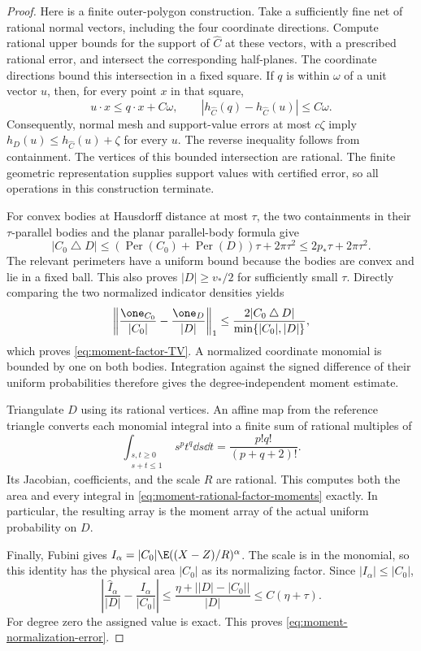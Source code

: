 \begin{proof}
Here is a finite outer-polygon construction.  Take a sufficiently
fine net of rational normal vectors, including the four coordinate
directions.  Compute rational upper bounds for the support of
$\widehat C$ at these vectors, with a prescribed rational error,
and intersect the corresponding half-planes.  The coordinate
directions bound this intersection in a fixed square.  If $q$ is
within $\omega$ of a unit vector $u$, then, for every point $x$ in
that square,
\[
 u\cdot x\le q\cdot x+C\omega,
 \qquad
 |h_{\widehat C}(q)-h_{\widehat C}(u)|\le C\omega.
\]
Consequently, normal mesh and support-value errors at most
$c\zeta$ imply $h_D(u)\le h_{\widehat C}(u)+\zeta$ for every $u$.
The reverse inequality follows from containment.  The vertices of
this bounded intersection are rational.  The finite geometric
representation supplies support values with certified error, so all
operations in this construction terminate.

For convex bodies at Hausdorff distance at most $\tau$, the two
containments in their $\tau$-parallel bodies and the planar
parallel-body formula give
\[
 |C_0\mathbin\triangle D|
       \le (\operatorname{Per}(C_0)+\operatorname{Per}(D))\tau
                    +2\pi\tau^2
       \le 2p_*\tau+2\pi\tau^2.
\]
The relevant perimeters have a uniform bound because the bodies
are convex and lie in a fixed ball.  This also proves
$|D|\ge v_*/2$ for sufficiently small $\tau$.  Directly comparing
the two normalized indicator densities yields
\[
 \left\|\frac{\one_{C_0}}{|C_0|}
              -\frac{\one_D}{|D|}\right\|_1
 \le \frac{2|C_0\mathbin\triangle D|}
                       {\min\{|C_0|,|D|\}},
\]
which proves \eqref{eq:moment-factor-TV}.  A normalized coordinate
monomial is bounded by one on both bodies.  Integration against the
signed difference of their uniform probabilities therefore gives
the degree-independent moment estimate.

Triangulate $D$ using its rational vertices.  An affine map from
the reference triangle converts each monomial integral into a finite
sum of rational multiples of
\[
 \int_{\substack{s,t\ge0\\s+t\le1}}s^p t^q\dd s\dd t
                       =\frac{p!q!}{(p+q+2)!}.
\]
Its Jacobian, coefficients, and the scale $R$ are rational.  This
computes both the area and every integral in
\eqref{eq:moment-rational-factor-moments} exactly.  In particular,
the resulting array is the moment array of the actual uniform
probability on $D$.

Finally, Fubini gives
$I_\alpha=|C_0|\E((X-Z)/R)^\alpha$.  The scale is in the
monomial, so this identity has the physical area $|C_0|$ as its
normalizing factor.  Since $|I_\alpha|\le|C_0|$,
\[
 \left|\frac{\widehat I_\alpha}{|D|}
                    -\frac{I_\alpha}{|C_0|}\right|
 \le \frac{\eta+\bigl||D|-|C_0|\bigr|}{|D|}
 \le C(\eta+\tau).
\]
For degree zero the assigned value is exact.  This proves
\eqref{eq:moment-normalization-error}.
\end{proof}

